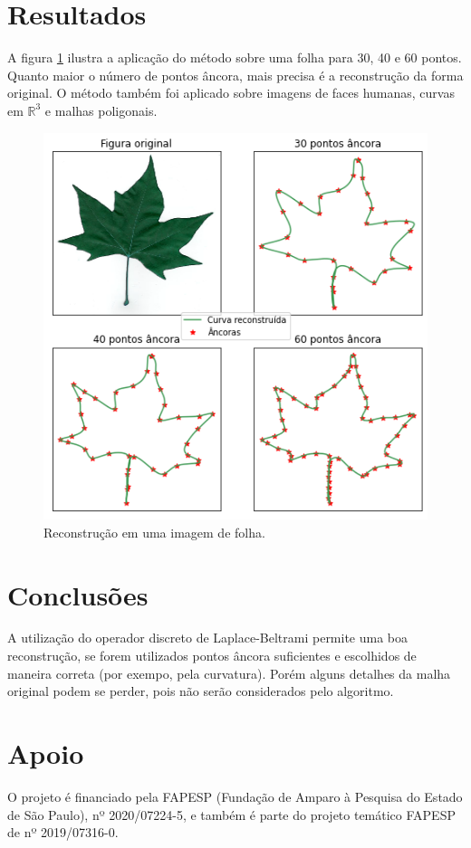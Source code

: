 \documentclass[a4paper,10pt,twocolumn]{article}
\begin{document}
	\section*{\hfil Resultados}
	
	A figura \ref{fig:leafs} ilustra a aplicação do método sobre uma folha para 30, 40 e 60 pontos. Quanto maior o número de pontos âncora, mais precisa é a reconstrução da forma original. O método também foi aplicado sobre imagens de faces humanas, curvas em $\mathbb{R}^3$ e malhas poligonais.
	

	\begin{figure}[ht!]
		\centering
		\includegraphics[width=0.81\linewidth]{imagens/leafs.png}
		\caption{Reconstrução em uma imagem de folha.}
		\label{fig:leafs}
	\end{figure}
	
	
	\section*{\hfil Conclusões}
	A utilização do operador discreto de Laplace-Beltrami permite uma boa reconstrução, se forem utilizados pontos âncora suficientes e escolhidos de maneira correta (por exempo, pela curvatura). Porém alguns detalhes da malha original podem se perder, pois não serão considerados pelo algoritmo.
	
	
	\renewcommand\refname{\hfil Referências Bibliográficas \hfil}
%
	\begin{center}
	\begin{thebibliography}{LLL}	
	\end{thebibliography}
	\end{center}
	
	\section*{\hfil Apoio}
	O projeto é financiado pela FAPESP (Fundação de Amparo à Pesquisa do Estado de São Paulo), nº 2020/07224-5, e também é parte do projeto temático FAPESP de nº 2019/07316-0.
	
	
\end{document}
